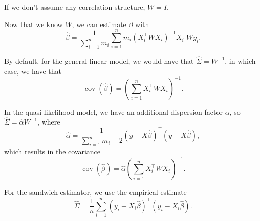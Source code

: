 \documentclass[11pt, letterpaper]{article}
\begin{document}
\begin{description}
  If we don't assume any correlation structure, $W = I$.

  Now that we know $W$, we can estimate $\beta$ with
  \begin{equation}
    \hat{\beta} = \frac{1}{\sum_{i=1}^nm_i}\sum_{i=1}^nm_i\left(X_i^\intercal W X_i\right)^{-1} X_i^\intercal W y_i.
  \end{equation}
  
  By default, for the general linear model, we would have that
  $\hat{\Sigma} = W^{-1}$, in which case, we have that
  \begin{equation}
    \operatorname{cov}\left(\hat{\beta}\right)
    = \left(\sum_{i=1}^n X_i^\intercal W X_i\right)^{-1}.
  \end{equation}

  In the quasi-likelihood model, we have an additional dispersion factor
  $\alpha$, so $\hat{\Sigma} = \hat{\alpha}W^{-1}$, where
  \begin{equation}
    \hat{\alpha} = \frac{1}{\sum_{i=1}^n m_i - 2}
    \left(y - X\hat{\beta}\right)^\intercal\left(y - X\hat{\beta}\right),
  \end{equation}
  which results in the covariance
  \begin{equation}
    \operatorname{cov}\left(\hat{\beta}\right)
    = \hat{\alpha} \left(\sum_{i=1}^n X_i^\intercal W X_i\right)^{-1}.
  \end{equation}

  For the sandwich estimator, we use the empirical estimate
  \begin{equation}
    \hat{\Sigma} = \frac{1}{n}\sum_{i=1}^n
    \left(y_i - X_i\hat{\beta}\right)^\intercal \left(y_i - X_i\hat{\beta}\right).
  \end{equation}
  
\end{description}
\end{document}
